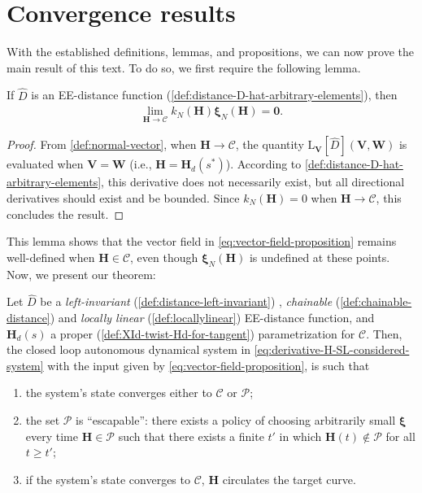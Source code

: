 \section{Convergence results}
\label{subs:conv-result}
With the established definitions, lemmas, and propositions, we can now prove the main result of this text. To do so, we first require the following lemma.

\begin{lemma} \label{lemma:xiNvanishing} If $\widehat{D}$ is an EE-distance function (\cref{def:distance-D-hat-arbitrary-elements}), then 
    \begin{align}
        \lim_{\mathbf{H} \rightarrow \mathcal{C}} k_N(\mathbf{H}) \boldsymbol{\xi}_N(\mathbf{H}) = \mathbf{0}.
    \end{align}
\end{lemma}
\begin{proof}
    From \cref{def:normal-vector}, when $\mathbf{H} \rightarrow \mathcal{C}$, the quantity $\text{L}_{\mathbf{V}}[\widehat{D}](\mathbf{V},\mathbf{W})$ is evaluated when $\mathbf{V} = \mathbf{W}$ (i.e., $\mathbf{H} = \mathbf{H}_d(s^*)$). According to \cref{def:distance-D-hat-arbitrary-elements}, this derivative does not necessarily exist, but all directional derivatives should exist and be bounded. Since $k_N(\mathbf{H}) = 0$ when $\mathbf{H} \rightarrow \mathcal{C}$, this concludes the result. 
\end{proof}
This lemma shows that the vector field in \eqref{eq:vector-field-proposition} remains well-defined when $\mathbf{H} \in \mathcal{C}$, even though $\boldsymbol{\xi}_N(\mathbf{H})$ is undefined at these points. Now, we present our theorem:
\begin{theorem}\label{thm:convergence-vector-field}
    Let $\widehat{D}$ be a \emph{left-invariant} (\cref{def:distance-left-invariant}) , \emph{chainable} (\cref{def:chainable-distance}) and \emph{locally linear} (\cref{def:locallylinear}) EE-distance function, and $\mathbf{H}_d(s)$ a proper (\cref{def:XId-twist-Hd-for-tangent}) parametrization for $\mathcal{C}$. Then, the closed loop autonomous dynamical system in  \eqref{eq:derivative-H-SL-considered-system} with the input given by  \eqref{eq:vector-field-proposition}, is such that 
    \begin{enumerate}[label=(\roman*)]
        \item the system's state converges either to $\mathcal{C}$ or $\mathcal{P}$;
        \item the set $\mathcal{P}$ is ``escapable'': there exists a policy of choosing arbitrarily small $\boldsymbol{\xi}$ every time $\mathbf{H} \in \mathcal{P}$ such that there exists a finite $t'$ in which $\mathbf{H}(t) \not \in \mathcal{P}$ for all $t \geq t'$;
        \item if the system's state converges to  $\mathcal{C}$, $\mathbf{H}$ circulates the target curve.
    \end{enumerate}
\end{theorem}
